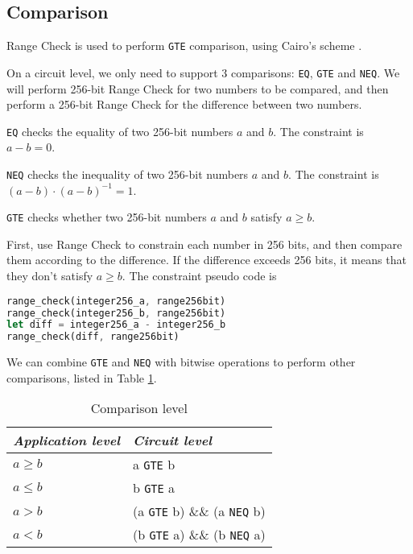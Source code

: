 \subsection{Comparison}

Range Check is used to perform \verb|GTE| comparison, using Cairo's scheme \cite{cryptoeprint:2021/1063}.

On a circuit level, we only need to support 3 comparisons: \verb|EQ|, \verb|GTE| and \verb|NEQ|. We will perform 256-bit Range Check for two numbers to be compared, and then perform a 256-bit Range Check for the difference between two numbers.

\verb|EQ| checks the equality of two 256-bit numbers $a$ and $b$. The constraint is $a-b=0$.

\verb|NEQ| checks the inequality of two 256-bit numbers $a$ and $b$. The constraint is $(a-b)\cdot(a-b)^{-1}=1$.

\verb|GTE| checks whether two 256-bit numbers $a$ and $b$ satisfy $a \geq b$.

First, use Range Check to constrain each number in 256 bits, and then compare them according to the difference. If the difference exceeds 256 bits, it means that they don't satisfy $a \geq b$. The constraint pseudo code is
\begin{lstlisting}[language=Rust]
range_check(integer256_a, range256bit)
range_check(integer256_b, range256bit)
let diff = integer256_a - integer256_b
range_check(diff, range256bit)
\end{lstlisting}

We can combine \verb|GTE| and \verb|NEQ| with bitwise operations to perform other comparisons, listed in Table \ref{table:comparison-level}.
\begin{table}[!ht]
    \centering
    \begin{tabular}{|l|l|}
    \hline
        \emph{Application level} & \emph{Circuit level} \\ \hline
        $a \ge b$ & a \verb|GTE| b \\
        $a \le b$ & b \verb|GTE| a \\
        $a > b$ & (a \verb|GTE| b) \&\& (a \verb|NEQ| b) \\
        $a < b$ & (b \verb|GTE| a) \&\& (b \verb|NEQ| a) \\ \hline
    \end{tabular}
    \caption{Comparison level}
    \label{table:comparison-level}
\end{table}

